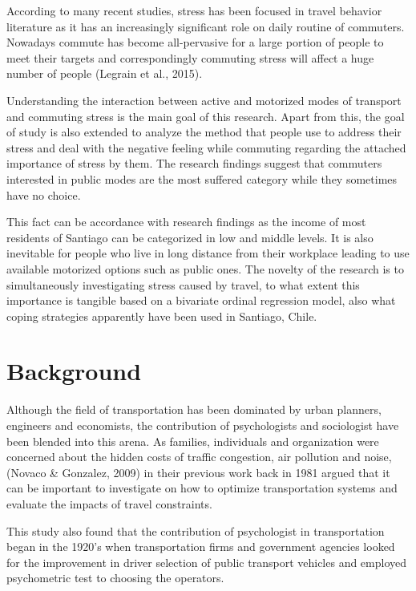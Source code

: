 \documentclass[
11pt, %
oneside, %
english, %
singlespacing, %
]{macthesis} %
\begin{document}
According to many recent studies, stress has been focused in travel behavior literature as it has an increasingly significant role on daily routine of commuters. Nowadays commute has become all-pervasive for a large portion of people to meet their targets and correspondingly commuting stress will affect a huge number of people (Legrain et al., 2015).

Understanding the interaction between active and motorized modes of transport and commuting stress is the main goal of this research. Apart from this, the goal of study is also extended to analyze the method that people use to address their stress and deal with the negative feeling while commuting regarding the attached importance of stress by them. The research findings suggest that commuters interested in public modes are the most suffered category while they sometimes have no choice.

This fact can be accordance with research findings as the income of most residents of Santiago can be categorized in low and middle levels. It is also inevitable for people who live in long distance from their workplace leading to use available motorized options such as public ones. The novelty of the research is to simultaneously investigating stress caused by travel, to what extent this importance is tangible based on a bivariate ordinal regression model, also what coping strategies apparently have been used in Santiago, Chile.

\hypertarget{background}{%
\section{Background}\label{background}}

Although the field of transportation has been dominated by urban planners, engineers and economists, the contribution of psychologists and sociologist have been blended into this arena. As families, individuals and organization were concerned about the hidden costs of traffic congestion, air pollution and noise, (Novaco \& Gonzalez, 2009) in their previous work back in 1981 argued that it can be important to investigate on how to optimize transportation systems and evaluate the impacts of travel constraints.

This study also found that the contribution of psychologist in transportation began in the 1920's when transportation firms and government agencies looked for the improvement in driver selection of public transport vehicles and employed psychometric test to choosing the operators.
\end{document}
